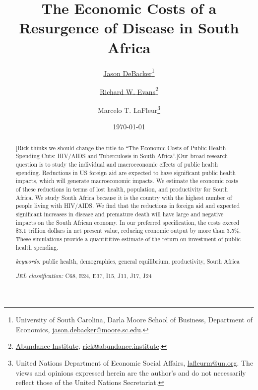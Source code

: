 \documentclass[letterpaper,12pt]{article}
\theoremstyle{definition}
\begin{document}
\begin{titlepage}
\title{The Economic Costs of a Resurgence of Disease in South Africa}
\date{\today}
\author{\href{http://jasondebacker.com/}{Jason DeBacker}\thanks{University of South Carolina, Darla Moore School of Business, Department of Economics, \href{mailto:jason.debacker@moore.sc.edu}{jason.debacker@moore.sc.edu}.}\and \href{https://sites.google.com/site/rickecon}{Richard W. Evans}\thanks{\href{https://abundance.institute/}{Abundance Institute}, \href{mailto:rick@abundance.institute}{rick@abundance.institute}.}\and {Marcelo T. LaFleur}\thanks{{United Nations Department of Economic Social Affairs}, \href{mailto:lafleurm@un.org}{lafleurm@un.org}. The views and opinions expressed herein are the author's and do not necessarily reflect those of the United Nations Secretariat.}}
\maketitle
\vspace{-2mm}
\begin{abstract}
\small{[Rick thinks we should change the title to ``The Economic Costs of Public Health Spending Cuts: HIV/AIDS and Tuberculosis in South Africa''.]Our broad research question is to study the individual and macroeconomic effects of public health spending. Reductions in US foreign aid are expected to have significant public health impacts, which will generate macroeconomic impacts. We estimate the economic costs of these reductions in terms of lost health, population, and productivity for South Africa. We study South Africa because it is the country with the highest number of people living with HIV/AIDS. We find that the reductions in foreign aid and expected significant increases in disease and premature death will have large and negative impacts on the South African economy. In our preferred specification, the costs exceed \$3.1 trillion dollars in net present value, reducing economic output by more than 3.5\%. These simulations provide a quantititive estimate of the return on investment of public health spending.}

\vspace{10mm}

\noindent\textit{keywords:}\: public health, demographics, general equilibrium, productivity, South Africa

\vspace{10mm}

\noindent\textit{JEL classification:} C68, E24, E37, I15, J11, J17, J24


\end{abstract}
\thispagestyle{empty}
\end{titlepage}
\end{document}

